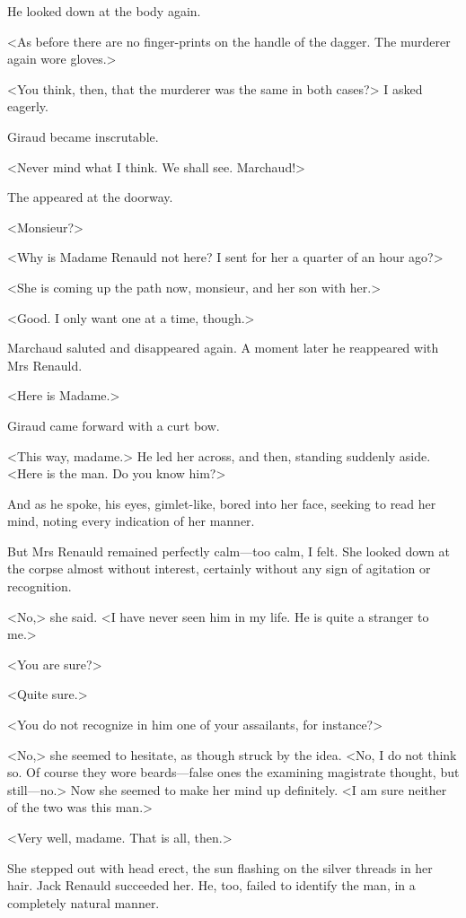  He looked down at the body again. 

 <As before there are no finger-prints on the handle of the dagger. The murderer again wore gloves.> 

 <You think, then, that the murderer was the same in both cases?> I asked eagerly. 

 Giraud became inscrutable. 

 <Never mind what I think. We shall see. Marchaud!> 

 The  appeared at the doorway. 

 <Monsieur?> 

 <Why is Madame Renauld not here? I sent for her a quarter of an hour ago?> 

 <She is coming up the path now, monsieur, and her son with her.> 

 <Good. I only want one at a time, though.> 

 Marchaud saluted and disappeared again. A moment later he reappeared with Mrs Renauld. 

 <Here is Madame.> 

 Giraud came forward with a curt bow. 

 <This way, madame.> He led her across, and then, standing suddenly aside. <Here is the man. Do you know him?> 

 And as he spoke, his eyes, gimlet-like, bored into her face, seeking to read her mind, noting every indication of her manner. 

 But Mrs Renauld remained perfectly calm—too calm, I felt. She looked down at the corpse almost without interest, certainly without any sign of agitation or recognition. 

 <No,> she said. <I have never seen him in my life. He is quite a stranger to me.> 

 <You are sure?> 

 <Quite sure.> 

 <You do not recognize in him one of your assailants, for instance?> 

 <No,> she seemed to hesitate, as though struck by the idea. <No, I do not think so. Of course they wore beards—false ones the examining magistrate thought, but still—no.> Now she seemed to make her mind up definitely. <I am sure neither of the two was this man.> 

 <Very well, madame. That is all, then.> 

 She stepped out with head erect, the sun flashing on the silver threads in her hair. Jack Renauld succeeded her. He, too, failed to identify the man, in a completely natural manner. 

